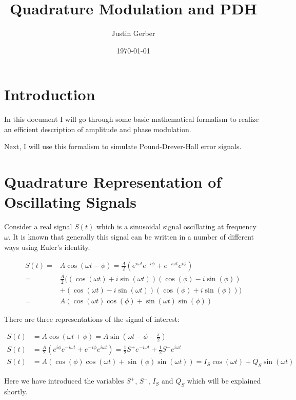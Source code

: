 \documentclass[12pt]{article}
\begin{document}
\title{Quadrature Modulation and PDH}
\author{Justin Gerber}
\date{\today}
\maketitle

\section{Introduction}

In this document I will go through some basic mathematical formalism to realize an efficient description of amplitude and phase modulation.

Next, I will use this formalism to simulate Pound-Drever-Hall error signals.

\section{Quadrature Representation of Oscillating Signals}

Consider a real signal $S(t)$ which is a sinusoidal signal oscillating at frequency $\omega$. It is known that generally this signal can be written in a number of different ways using Euler's identity.

\begin{align}
S(t) =& A \cos(\omega t - \phi) = \frac{A}{2}\left(e^{i\omega t}e^{-i\phi} + e^{-i\omega t} e^{i\phi}\right)\\
=& \frac{A}{2}\Big((\cos(\omega t) + i \sin(\omega t))(\cos(\phi)-i\sin(\phi))\\
&+ (\cos(\omega t)-i\sin(\omega t))(\cos(\phi)+i\sin(\phi))\Big)\\
=& A\left(\cos(\omega t)\cos(\phi) + \sin(\omega t)\sin(\phi) \right)
\end{align}

There are three representations of the signal of interest:

\begin{align}
S(t) &= A\cos(\omega t + \phi) = A\sin\left(\omega t - \phi - \frac{\pi}{2}\right)\\
S(t) &= \frac{A}{2}\left(e^{i\phi}e^{-i\omega t} + e^{-i\phi}e^{i\omega t}\right) = \frac{1}{2}S^+e^{-i\omega t} + \frac{1}{2}S^-e^{i\omega t}\\
S(t) &= A\left(\cos(\phi)\cos(\omega t) +\sin(\phi)\sin(\omega t)\right) = I_S \cos(\omega t) + Q_S\sin(\omega t)
\end{align}

Here we have introduced the variables $S^+$, $S^-$, $I_S$ and $Q_S$ which will be explained shortly.
\end{document}
